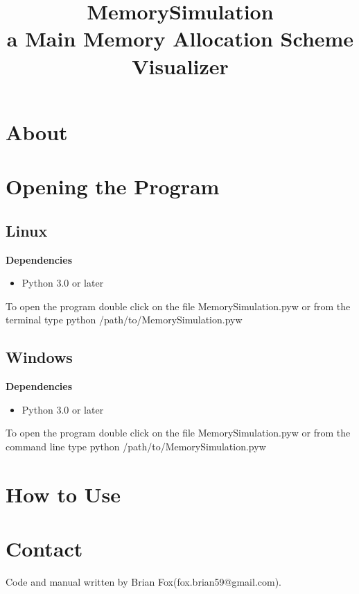 \documentclass[10pt]{article}
\title{MemorySimulation\\\large{}a Main Memory Allocation Scheme Visualizer}
\date{}
\begin{document}
\maketitle
\section{About}

\section{Opening the Program}

\subsection{Linux}
\textbf{Dependencies}
\begin{itemize}
\item Python 3.0 or later
\end{itemize}
To open the program double click on the file MemorySimulation.pyw or from the terminal type python /path/to/MemorySimulation.pyw
\subsection{Windows}
\textbf{Dependencies}
\begin{itemize}
\item Python 3.0 or later
\end{itemize}
To open the program double click on the file MemorySimulation.pyw or from the command line type python /path/to/MemorySimulation.pyw
\section{How to Use}
\section{Contact}
Code and manual written by Brian Fox(fox.brian59@gmail.com).
\end{document}
